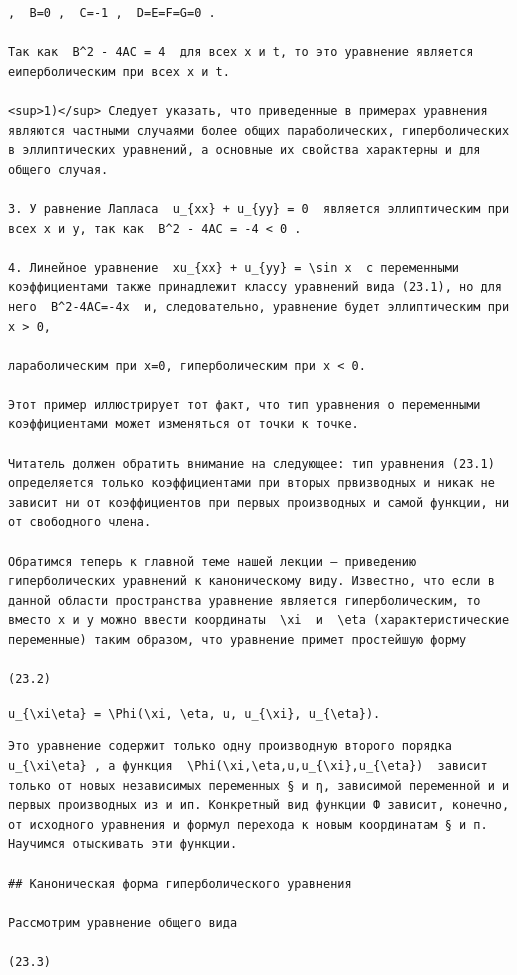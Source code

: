 \documentclass[
  ukrainian,
]{article}
\begin{document}
\begin{verbatim}
,  B=0 ,  C=-1 ,  D=E=F=G=0 .

Так как  B^2 - 4AC = 4  для всех x и t, то это уравнение является еиперболическим при всех x и t.

<sup>1)</sup> Следует указать, что приведенные в примерах уравнения являются частными случаями более общих параболических, гиперболических в эллиптических уравнений, а основные их свойства характерны и для общего случая.

3. У равнение Лапласа  u_{xx} + u_{yy} = 0  является эллиптическим при всех x и y, так как  B^2 - 4AC = -4 < 0 .

4. Линейное уравнение  xu_{xx} + u_{yy} = \sin x  с переменными коэффициентами также принадлежит классу уравнений вида (23.1), но для него  B^2-4AC=-4x  и, следовательно, уравнение будет эллиптическим при x > 0,

лараболическим при x=0, гиперболическим при x < 0.

Этот пример иллюстрирует тот факт, что тип уравнения о переменными коэффициентами может изменяться от точки к точке.

Читатель должен обратить внимание на следующее: тип уравнения (23.1) определяется только коэффициентами при вторых првизводных и никак не зависит ни от коэффициентов при первых производных и самой функции, ни от свободного члена.

Обратимся теперь к главной теме нашей лекции — приведению гиперболических уравнений к каноническому виду. Известно, что если в данной области пространства уравнение является гиперболическим, то вместо x и y можно ввести координаты  \xi  и  \eta (характеристические переменные) таким образом, что уравнение примет простейшую форму

(23.2)
\end{verbatim}

\texttt{u\_\{\textbackslash{}xi\textbackslash{}eta\}\ =\ \textbackslash{}Phi(\textbackslash{}xi,\ \textbackslash{}eta,\ u,\ u\_\{\textbackslash{}xi\},\ u\_\{\textbackslash{}eta\}).}

\begin{verbatim}
Это уравнение содержит только одну производную второго порядка  u_{\xi\eta} , а функция  \Phi(\xi,\eta,u,u_{\xi},u_{\eta})  зависит только от новых независимых переменных § и η, зависимой переменной и и первых производных из и ип. Конкретный вид функции Ф зависит, конечно, от исходного уравнения и формул перехода к новым координатам § и п. Научимся отыскивать эти функции.

## Каноническая форма гиперболического уравнения

Рассмотрим уравнение общего вида

(23.3)
\end{verbatim}
\end{document}
